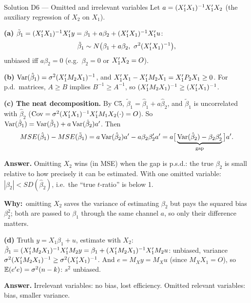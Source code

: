 \documentclass[11pt]{article}
\newcommand{\step}[1]{\par\smallskip\noindent\textbf{\textcolor{qnavy}{#1}}\quad\ignorespaces}
\newcommand{\Why}{\textbf{\textcolor{whyline}{Why:}}\ }
\newcommand{\Ans}[1]{\par\smallskip\noindent\colorbox{qlight}{\parbox{\dimexpr\linewidth-2\fboxsep}{\textbf{Answer.} #1}}\par}
\begin{document}
\begin{solbox}{Solution D6 --- Omitted and irrelevant variables}
Let $a = (X_{1}^{\prime} X_{1})^{-1}X_{1}^{\prime} X_{2}$ (the auxiliary regression of $X_{2}$ on $X_{1}$).
\step{(a)} $\tilde\beta_{1} = (X_{1}^{\prime} X_{1})^{-1}X_{1}^{\prime} y = \beta_{1} + a\beta_{2} + (X_{1}^{\prime} X_{1})^{-1}X_{1}^{\prime} u$:
\[
  \tilde\beta_{1} \sim N\big(\beta_{1} + a\beta_{2},\ \sigma^{2}(X_{1}^{\prime} X_{1})^{-1}\big),
\]
unbiased iff $a\beta_{2} = 0$ (e.g.\ $\beta_{2} = 0$ or $X_{1}^{\prime} X_{2} = O$).
\step{(b)} $\operatorname{Var}(\hat\beta_{1}) = \sigma^{2}(X_{1}^{\prime} M_{2}X_{1})^{-1}$, and
$X_{1}^{\prime} X_{1} - X_{1}^{\prime} M_{2}X_{1} = X_{1}^{\prime} P_{2}X_{1} \ge 0$. For p.d.\ matrices, $A \ge B$ implies
$B^{-1} \ge A^{-1}$, so $(X_{1}^{\prime} M_{2}X_{1})^{-1} \ge (X_{1}^{\prime} X_{1})^{-1}$.
\step{(c) The neat decomposition.} By C5, $\tilde\beta_{1} = \hat\beta_{1} + a\hat\beta_{2}$, and $\tilde\beta_{1}$ is
uncorrelated with $\hat\beta_{2}$ ($\operatorname{Cov} = \sigma^{2}(X_{1}^{\prime} X_{1})^{-1}X_{1}^{\prime} M_{1}X_{2}(\cdot) = O$). So
$\operatorname{Var}(\hat\beta_{1}) = \operatorname{Var}(\tilde\beta_{1}) + a\operatorname{Var}(\hat\beta_{2})a^{\prime}$. Then
\[
  MSE(\hat\beta_{1}) - MSE(\tilde\beta_{1})
  = a\operatorname{Var}(\hat\beta_{2})a^{\prime} - a\beta_{2}\beta_{2}^{\prime} a^{\prime}
  = a\big[\underbrace{\operatorname{Var}(\hat\beta_{2}) - \beta_{2}\beta_{2}^{\prime}}_{\text{gap}}\big]a^{\prime} .
\]
\Ans{Omitting $X_{2}$ wins (in MSE) when the gap is p.s.d.: the true $\beta_{2}$ is small
relative to how precisely it can be estimated. With one omitted variable:
$|\beta_{2}| < SD(\hat\beta_{2})$, i.e.\ the ``true $t$-ratio'' is below 1.}
\begin{why}\Why omitting $X_{2}$ saves the variance of estimating $\beta_{2}$ but pays the
squared bias $\beta_{2}^{2}$; both are passed to $\beta_{1}$ through the same channel $a$, so
only their difference matters.\end{why}
\step{(d)} Truth $y = X_{1}\beta_{1} + u$, estimate with $X_{2}$:
$\hat\beta_{1} = (X_{1}^{\prime} M_{2}X_{1})^{-1}X_{1}^{\prime} M_{2}y = \beta_{1} + (X_{1}^{\prime} M_{2}X_{1})^{-1}X_{1}^{\prime} M_{2}u$:
unbiased, variance $\sigma^{2}(X_{1}^{\prime} M_{2}X_{1})^{-1} \ge \sigma^{2}(X_{1}^{\prime} X_{1})^{-1}$. And
$e = M_{X}y = M_{X}u$ (since $M_{X}X_{1} = O$), so $\mathbb{E}(e^{\prime} e) = \sigma^{2}(n-k)$: $s^{2}$ unbiased.
\Ans{Irrelevant variables: no bias, lost efficiency. Omitted relevant variables: bias, smaller variance.}
\end{solbox}
\end{document}
